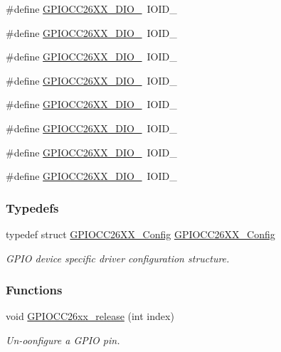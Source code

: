 \begin{DoxyCompactItemize}
\item 
\#define \hyperlink{_g_p_i_o_c_c26_x_x_8h_a8b0ea5a02c2021929f79019580312d79}{G\+P\+I\+O\+C\+C26\+X\+X\+\_\+\+D\+I\+O\+\_}~I\+O\+I\+D\+\_
\item 
\#define \hyperlink{_g_p_i_o_c_c26_x_x_8h_a3958f17cc269abea657eff59c25d6d82}{G\+P\+I\+O\+C\+C26\+X\+X\+\_\+\+D\+I\+O\+\_}~I\+O\+I\+D\+\_
\item 
\#define \hyperlink{_g_p_i_o_c_c26_x_x_8h_a09380ef292de0568024085542b905fe2}{G\+P\+I\+O\+C\+C26\+X\+X\+\_\+\+D\+I\+O\+\_}~I\+O\+I\+D\+\_
\item 
\#define \hyperlink{_g_p_i_o_c_c26_x_x_8h_a1b5462223c705b087bb6fe038e1edb44}{G\+P\+I\+O\+C\+C26\+X\+X\+\_\+\+D\+I\+O\+\_}~I\+O\+I\+D\+\_
\item 
\#define \hyperlink{_g_p_i_o_c_c26_x_x_8h_af46ec9fe29cc059be1183d7abbf3b20b}{G\+P\+I\+O\+C\+C26\+X\+X\+\_\+\+D\+I\+O\+\_}~I\+O\+I\+D\+\_
\item 
\#define \hyperlink{_g_p_i_o_c_c26_x_x_8h_acbef3dd6c35bb9be9382cd04e599840e}{G\+P\+I\+O\+C\+C26\+X\+X\+\_\+\+D\+I\+O\+\_}~I\+O\+I\+D\+\_
\item 
\#define \hyperlink{_g_p_i_o_c_c26_x_x_8h_a157328572f63fec37c4fe75d0b934617}{G\+P\+I\+O\+C\+C26\+X\+X\+\_\+\+D\+I\+O\+\_}~I\+O\+I\+D\+\_
\item 
\#define \hyperlink{_g_p_i_o_c_c26_x_x_8h_aaa466824da319dfa3f84032fdba8740b}{G\+P\+I\+O\+C\+C26\+X\+X\+\_\+\+D\+I\+O\+\_}~I\+O\+I\+D\+\_
\end{DoxyCompactItemize}
\subsubsection*{Typedefs}
\begin{DoxyCompactItemize}
\item 
typedef struct \hyperlink{struct_g_p_i_o_c_c26_x_x___config}{G\+P\+I\+O\+C\+C26\+X\+X\+\_\+\+Config} \hyperlink{_g_p_i_o_c_c26_x_x_8h_a483053b4270a9694fc8079e77217d453}{G\+P\+I\+O\+C\+C26\+X\+X\+\_\+\+Config}
\begin{DoxyCompactList}\small\item\em G\+P\+I\+O device specific driver configuration structure. \end{DoxyCompactList}\end{DoxyCompactItemize}
\subsubsection*{Functions}
\begin{DoxyCompactItemize}
\item 
void \hyperlink{_g_p_i_o_c_c26_x_x_8h_a3f6016047a2b28e213692960f74fa8e9}{G\+P\+I\+O\+C\+C26xx\+\_\+release} (int index)
\begin{DoxyCompactList}\small\item\em Un-\/oonfigure a G\+P\+I\+O pin. \end{DoxyCompactList}\end{DoxyCompactItemize}



